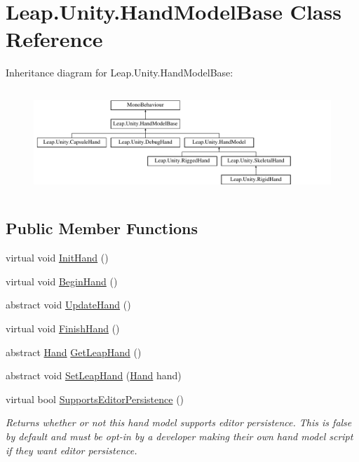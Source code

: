 \hypertarget{class_leap_1_1_unity_1_1_hand_model_base}{}\section{Leap.\+Unity.\+Hand\+Model\+Base Class Reference}
\label{class_leap_1_1_unity_1_1_hand_model_base}
Inheritance diagram for Leap.\+Unity.\+Hand\+Model\+Base\+:\begin{figure}[H]
\begin{center}
\leavevmode
\includegraphics[height=3.954802cm]{class_leap_1_1_unity_1_1_hand_model_base}
\end{center}
\end{figure}
\subsection*{Public Member Functions}
\begin{DoxyCompactItemize}
\item 
virtual void \mbox{\hyperlink{class_leap_1_1_unity_1_1_hand_model_base_a4789222f2b16957437c703f15afc1bbf}{Init\+Hand}} ()
\item 
virtual void \mbox{\hyperlink{class_leap_1_1_unity_1_1_hand_model_base_a3b60b707011fa39db35ca3c902167ade}{Begin\+Hand}} ()
\item 
abstract void \mbox{\hyperlink{class_leap_1_1_unity_1_1_hand_model_base_ae80b6c96322d078f01aacc02639d9dd0}{Update\+Hand}} ()
\item 
virtual void \mbox{\hyperlink{class_leap_1_1_unity_1_1_hand_model_base_a042b3778ca6a61c7991d1ffaecdf7eed}{Finish\+Hand}} ()
\item 
abstract \mbox{\hyperlink{class_leap_1_1_hand}{Hand}} \mbox{\hyperlink{class_leap_1_1_unity_1_1_hand_model_base_aa24ca02bf4a64ba33b0370ad6da8731f}{Get\+Leap\+Hand}} ()
\item 
abstract void \mbox{\hyperlink{class_leap_1_1_unity_1_1_hand_model_base_ab8830cac842482ed7d1045beeb54e98c}{Set\+Leap\+Hand}} (\mbox{\hyperlink{class_leap_1_1_hand}{Hand}} hand)
\item 
virtual bool \mbox{\hyperlink{class_leap_1_1_unity_1_1_hand_model_base_acd4789523584dd7d240e1d426b4d321c}{Supports\+Editor\+Persistence}} ()
\begin{DoxyCompactList}\small\item\em Returns whether or not this hand model supports editor persistence. This is false by default and must be opt-\/in by a developer making their own hand model script if they want editor persistence. \end{DoxyCompactList}\end{DoxyCompactItemize}
